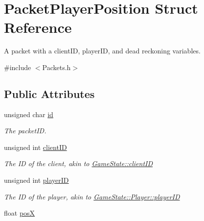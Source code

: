 \hypertarget{struct_packet_player_position}{\section{Packet\-Player\-Position Struct Reference}
\label{struct_packet_player_position}
}


A packet with a client\-I\-D, player\-I\-D, and dead reckoning variables.  




{\ttfamily \#include $<$Packets.\-h$>$}

\subsection*{Public Attributes}
\begin{DoxyCompactItemize}
\item 
\hypertarget{struct_packet_player_position_ad80364604ce3113e51136c2b0ca5d6e0}{unsigned char \hyperlink{struct_packet_player_position_ad80364604ce3113e51136c2b0ca5d6e0}{id}}\label{struct_packet_player_position_ad80364604ce3113e51136c2b0ca5d6e0}

\begin{DoxyCompactList}\small\item\em The packet\-I\-D. \end{DoxyCompactList}\item 
\hypertarget{struct_packet_player_position_a3647ac419f4e01afe948da2468b67658}{unsigned int \hyperlink{struct_packet_player_position_a3647ac419f4e01afe948da2468b67658}{client\-I\-D}}\label{struct_packet_player_position_a3647ac419f4e01afe948da2468b67658}

\begin{DoxyCompactList}\small\item\em The I\-D of the client, akin to \hyperlink{class_game_state_a7c5acf663dc54a1d6de3254209b8fff2}{Game\-State\-::client\-I\-D} \end{DoxyCompactList}\item 
\hypertarget{struct_packet_player_position_a94c602eaa03f27c22937d37257368ab6}{unsigned int \hyperlink{struct_packet_player_position_a94c602eaa03f27c22937d37257368ab6}{player\-I\-D}}\label{struct_packet_player_position_a94c602eaa03f27c22937d37257368ab6}

\begin{DoxyCompactList}\small\item\em The I\-D of the player, akin to \hyperlink{class_game_state_1_1_player_acbd28d89e6eb8611aa66452ec31e9133}{Game\-State\-::\-Player\-::player\-I\-D} \end{DoxyCompactList}\item 
\hypertarget{struct_packet_player_position_a1719505fbc59c8f4948cfec4772859b0}{float \hyperlink{struct_packet_player_position_a1719505fbc59c8f4948cfec4772859b0}{pos\-X}}\label{struct_packet_player_position_a1719505fbc59c8f4948cfec4772859b0}


\end{DoxyCompactItemize}
